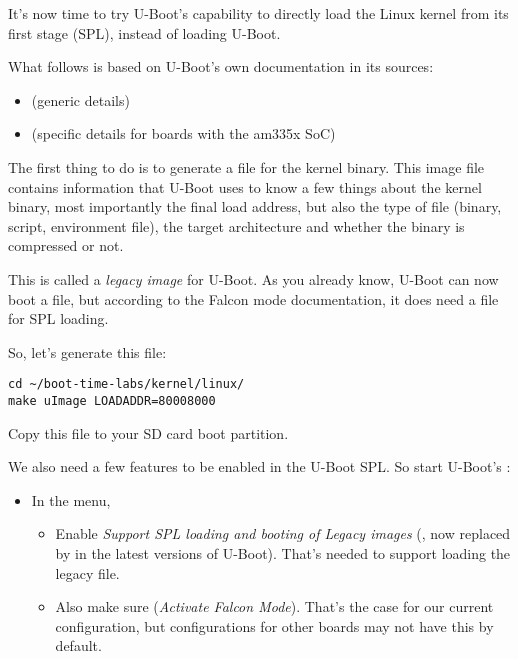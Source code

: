 It's now time to try U-Boot's capability to directly load the
Linux kernel from its first stage (SPL), instead of loading U-Boot.

What follows is based on U-Boot's own documentation in its sources:
\begin{itemize}
\item {} (generic details)
\item {} (specific details for boards with
      the am335x SoC)
\end{itemize}

The first thing to do is to generate a  file for the kernel
binary. This image file contains information that U-Boot uses to know a
few things about the kernel binary, most importantly the final load
address, but also the type of file (binary, script, environment file),
the target architecture and whether the binary is compressed or not.

This is called a {\em legacy image} for U-Boot. As you already know,
U-Boot can now boot a  file, but according to the Falcon
mode documentation, it does need a  file for SPL loading.

So, let's generate this file:
\begin{verbatim}
cd ~/boot-time-labs/kernel/linux/
make uImage LOADADDR=80008000
\end{verbatim}

Copy this  file to your SD card boot partition.

We also need a few features to be enabled in the U-Boot SPL. So start
U-Boot's :
\begin{itemize}
\item In the  menu,
      \begin{itemize}
      \item Enable {\em Support SPL loading and booting of Legacy images}
	    (, now replaced by
	     in the latest
	    versions of U-Boot).
            That's needed to support loading the legacy  file.
      \item Also make sure 
            ({\em Activate Falcon Mode}).
            That's the case for our current configuration, but configurations
            for other boards may not have this by default.
      \end{itemize}
\end{itemize}


